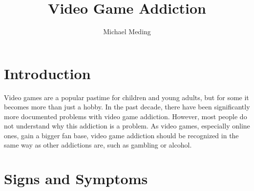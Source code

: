 \documentclass[a4paper,man,natbib]{apa6}
\title{Video Game Addiction}
\author{Michael Meding}
\affiliation{University of Massachusetts Lowell}
\begin{document}
\maketitle

\section{Introduction}

\paragraph{}
	Video games are a popular pastime for children and young adults, but for some it becomes more than just a hobby. In the past decade, there have been significantly more documented problems with video game addiction. However, most people do not understand why this addiction is a problem. As video games, especially online ones, gain a bigger fan base, video game addiction should be recognized in the same way as other addictions are, such as gambling or alcohol.

\section{Signs and Symptoms}
\end{document}
